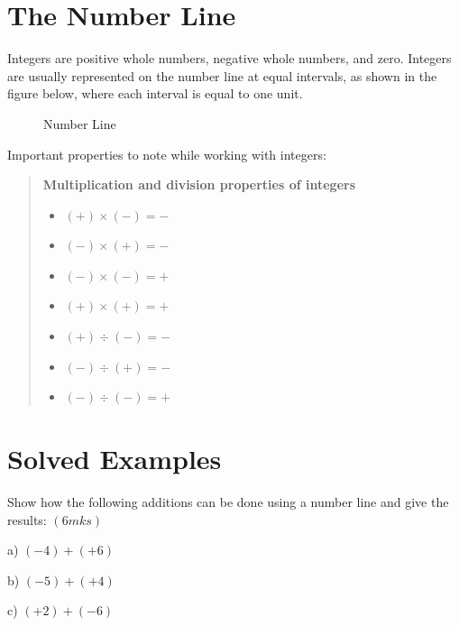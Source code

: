 \documentclass[
  a4paperpaper,
]{scrbook}
\begin{document}
\section{The Number Line}\label{the-number-line}

Integers are positive whole numbers, negative whole numbers, and zero.
Integers are usually represented on the number line at equal intervals,
as shown in the figure below, where each interval is equal to one unit.

\begin{figure}


\caption{\label{fig-numberline}Number Line}

\end{figure}%

Important properties to note while working with integers:

\begin{quote}
\textbf{Multiplication and division properties of integers}

\begin{itemize}
\item
  \((+)\times(-) = -\)
\item
  \((-) \times (+) = -\)
\item
  \((-) \times (-) = +\)
\item
  \((+) \times(+) = +\)
\item
  \((+)\div(-) = -\)
\item
  \((-)\div(+) = -\)
\item
  \((-)\div(-) = +\)
\end{itemize}
\end{quote}

\section{Solved Examples}\label{solved-examples-5}

\begin{tcolorbox}[enhanced jigsaw, left=2mm, colframe=quarto-callout-note-color-frame, toptitle=1mm, opacitybacktitle=0.6, rightrule=.15mm, colbacktitle=quarto-callout-note-color!10!white, colback=white, arc=.35mm, breakable, leftrule=.75mm, bottomtitle=1mm, bottomrule=.15mm, title=\textcolor{quarto-callout-note-color}{\faInfo}\hspace{0.5em}{Example 1}, titlerule=0mm, coltitle=black, toprule=.15mm, opacityback=0]

Show how the following additions can be done using a number line and
give the results: \((6mks)\)

a) \((-4)+(+6)\)

b) \((-5)+(+4)\)

c) \((+2)+(-6)\)

\end{tcolorbox}
\end{document}
